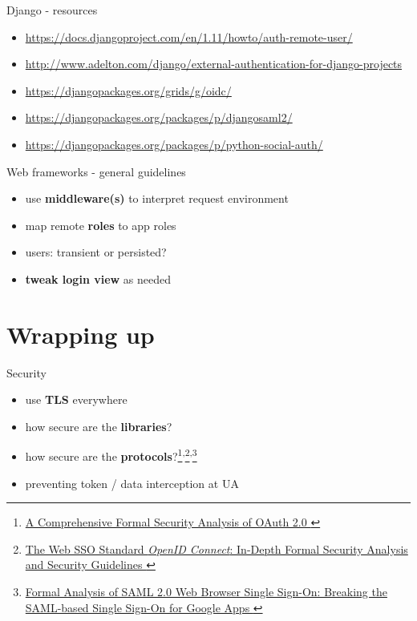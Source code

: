 \documentclass[ignorenonframetext,aspectratio=169]{beamer}
\providecommand{\tightlist}{%
  \setlength{\itemsep}{0pt}\setlength{\parskip}{0pt}}
\begin{document}
\begin{frame}{Django - resources}
\begin{itemize}
\tightlist

\item \url{https://docs.djangoproject.com/en/1.11/howto/auth-remote-user/}
\item \url{http://www.adelton.com/django/external-authentication-for-django-projects}
\item \url{https://djangopackages.org/grids/g/oidc/}
\item \url{https://djangopackages.org/packages/p/djangosaml2/}
\item \url{https://djangopackages.org/packages/p/python-social-auth/}

\end{itemize}
\end{frame}

\begin{frame}{Web frameworks - general guidelines}
\begin{itemize}
\tightlist
\item use {\bf middleware(s)} to interpret request environment
\item map remote {\bf roles} to app roles
\item users: transient or persisted?
\item {\bf tweak login view} as needed
\end{itemize}
\end{frame}

\section{Wrapping up}

\begin{frame}{Security}
\begin{itemize}
\tightlist
\item use {\bf TLS} everywhere
\item how secure are the {\bf libraries}?
\item how secure are the {\bf
    protocols}?\footnote{
        \href{https://arxiv.org/pdf/1601.01229v2.pdf}{
            A Comprehensive Formal Security Analysis of OAuth 2.0
        }
    }\textsuperscript{,}\footnote{
        \href{https://arxiv.org/pdf/1704.08539.pdf}{
            The Web SSO Standard {\em OpenID Connect}:
            In-Depth Formal Security Analysis and Security Guidelines
        }
    }\textsuperscript{,}\footnote{
        \href{https://ai-lab.it/armando/pub/fmse9-armando.pdf}{
            Formal Analysis of SAML 2.0 Web Browser Single Sign-On:
            Breaking the SAML-based Single Sign-On for Google Apps
        }
    }
\item preventing token / data interception at UA
\end{itemize}
\end{frame}
\end{document}

